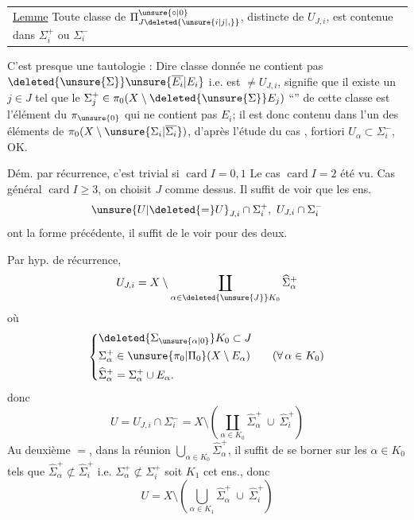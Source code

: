 \noindent\begin{tabular}{@{}|p{.91\linewidth}@{}}
\uline{Lemme} Toute classe de $\Pi_{J\deleted{\unsure{i|j|,}}}^{\unsure{\circ|0}}$, distincte de $U_{J,i}$, est contenue dans $\Sigma_i^+$ ou $\Sigma_i^-$
\end{tabular}

C'est presque une tautologie : Dire   classe donnée  ne contient pas $\deleted{\unsure{\Sigma}}\unsure{\overline{E_i}|E_i}$ i.e. est $\ne U_{J,i}$, signifie que il existe un $j\in J$ tel que le $\Sigma_j^+\in\pi_0(X\setminus \deleted{\unsure{\Sigma}}E_j)$  ``'' de cette classe  est l'élément du $\pi_{\unsure{0}}$ qui ne contient pas $E_i$; il est donc contenu dans l'un des éléments  de $\pi_0(X\setminus\unsure{\Sigma_i|\overline{\Sigma_i}})$, d'après l'étude du cas  ,   fortiori $U_\alpha\subset\Sigma_i^-$, OK.

Dém. par récurrence, c'est trivial si $\operatorname{card} I=0,1$ Le cas $\operatorname{card} I=2$  été vu. Cas général  $\operatorname{card} I\geq 3$, on choisit $J$ comme dessus. Il suffit de voir que les ens.
\[
\unsure{U|\deleted{=}U}_{J,i}\cap\Sigma_i^+,\ U_{J,i}\cap\Sigma_i^-
\]
ont la forme précédente, il suffit de le voir pour  des deux.

Par hyp. de récurrence, 
\[
U_{J,i}=X\setminus\coprod_{\alpha\in \deleted{\unsure{J}}K_0}\widehat{\Sigma}_\alpha^+
\]
où
\[
\left\{\begin{aligned}
&\deleted{\Sigma_{\unsure{\alpha|0}}}K_0\subset J\\
&\Sigma_\alpha^+\in\unsure{\pi_0|\Pi_0}(X\setminus E_\alpha)\qquad (\forall\,\alpha\in K_0)\\
&\widehat{\Sigma}_\alpha^+=\Sigma_\alpha^+\cup E_\alpha.
\end{aligned}\right.
\]
 donc
\[
U=U_{J,i}\cap\Sigma_i^-=X\setminus\left(\coprod_{\alpha\in K_0}\widehat{\Sigma}_\alpha^+\ \cup\ \widehat{\Sigma}_i^+\right)
\]
 Au deuxième $=$, dans la  réunion $\bigcup_{\alpha\in K_0}\widehat{\Sigma}_\alpha^+$, il suffit de se borner   sur les \deleted{$\Sigma$} $\alpha\in K_0$ tels que $\widehat{\Sigma}_\alpha^+\not\subset\widehat{\Sigma}_i^+$ i.e. $\Sigma_\alpha^+\not\subset\Sigma_i^+$ soit $K_1$ cet ens., donc
\[
U=X\setminus\left(\bigcup_{\alpha\in K_1}\widehat{\Sigma}_\alpha^+\ \cup\ \widehat{\Sigma}_i^+\right)
\]

